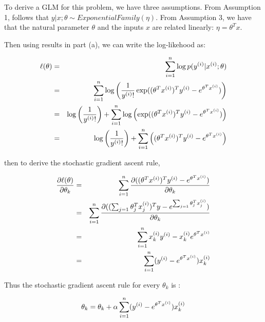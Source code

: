 \begin{answer}

To derive a GLM for this problem, we have three assumptions. From Assumption 1, follows  that $y|x;\theta \sim ExponentialFamily(\eta )$.  From Assumption 3, we have that the natural parameter $\theta$ and the inputs $x$ are related linearly:  $\eta =\theta^{T}x$.

Then using results in part (a), we can write the log-likehood as:

\begin{eqnarray*}
  \ell(\theta) &=& \sum_{i=1}^{n} \log p(y^{(i)} | x^{(i)}; \theta)\\
  &=& \sum_{i=1}^{n} \log\left( \frac{1}{y^{(i)}!}\exp( (\theta^{T}x^{(i)})^{T} y^{(i)}-e^{\theta^{T}x^{(i)}} )\right)\\
  &=&   \log\left( \frac{1}{y^{(i)}!}\right) + \sum_{i=1}^{n} \log\left(\exp( (\theta^{T} x^{(i)})^{T} y^{(i)}-e^{\theta^{T}x^{(i)}} ) \right)\\
  &=&   \log\left( \frac{1}{y^{(i)}!}\right) + \sum_{i=1}^{n} \left(  (\theta^{T}x^{(i)})^{T} y^{(i)}-e^{\theta^{T}x^{(i)}} \right)
\end{eqnarray*}

then to derive the stochastic gradient ascent rule,

\begin{eqnarray*}
  \frac{ \partial \ell(\theta)}{\partial \theta_{k}} &=&\sum_{i=1}^{n} \frac{ \partial(  (\theta^{T} x^{(i)})^{T} y^{(i)}-e^{\theta^{T}x^{(i)}})}{\partial \theta_{k}}\\
  &=&\sum_{i=1}^{n} \frac{ \partial(  (\sum_{j=1}\theta_{j}^{T} x_{j}^{(i)})^{T} y-e^{\sum_{j=1}\theta_{j}^{T} x_{j}^{(i)}})}{\partial \theta_{k}}\\
  &=&\sum_{i=1}^{n} x_{k}^{(i)}y^{(i)}-x_{k}^{(i)}e^{\theta^{T}x^{(i)}}\\
  &=& \sum_{i=1}^{n}(y^{(i)}-e^{\theta^{T}x^{(i)}})x_{k}^{(i)}
\end{eqnarray*}

Thus the stochastic gradient ascent rule for every $\theta_{k}$ is :

\begin{eqnarray*}
 \theta_{k} =\theta_{k} + \alpha \sum_{i=1}^{n} (y^{(i)}-e^{\theta^{T}x^{(i)}})x_{k}^{(i)}
\end{eqnarray*}


\end{answer}
